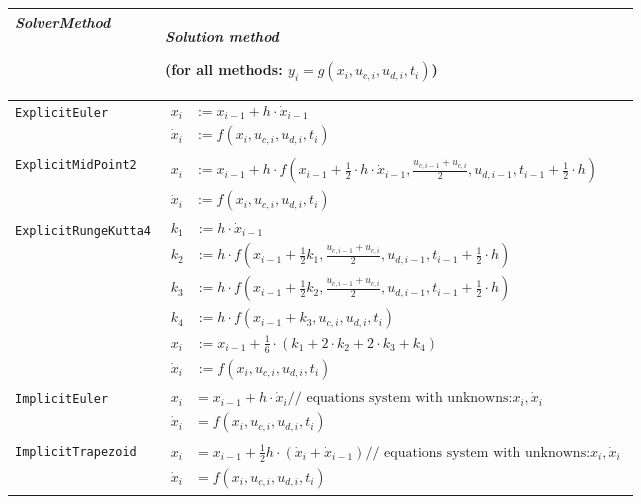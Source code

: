 \begin{longtable}[]{|p{3.5cm}|p{11cm}|}
\hline
\emph{SolverMethod} & 
\emph{Solution method}

(for all methods: $y_i=g(x_i,u_{c,i},u_{d,i},t_i)$)\\ \hline
\endhead
\lstinline!ExplicitEuler! & 
$\begin{aligned}
x_{i} &:= x_{i-1}+h\cdot\dot{x}_{i-1}\\
\dot{x}_{i} &:= f(x_i,u_{c,i},u_{d,i},t_i)
\end{aligned}$\\ \hline
\lstinline!ExplicitMidPoint2! &
$\begin{aligned}
x_{i} &:= x_{i-1}+h\cdot f(x_{i-1}+\frac{1}{2}\cdot h \cdot\dot{x}_{i-1},\frac{u_{c,i-1}+u_{c,i}}{2},u_{d,i-1},t_{i-1}+\tfrac{1}{2}\cdot h)\\
\dot{x}_{i} &:= f(x_i,u_{c,i},u_{d,i},t_i)
\end{aligned}$\\ \hline
\lstinline!ExplicitRungeKutta4! &
$\begin{aligned}
k_1 &:= h\cdot \dot{x}_{i-1}\\
k_2 &:= h\cdot f(x_{i-1}+\tfrac{1}{2}k_1,\frac{u_{c,i-1}+u_{c,i}}{2},u_{d,i-1},t_{i-1}+\tfrac{1}{2}\cdot h)\\
k_3 &:= h\cdot f(x_{i-1}+\tfrac{1}{2}k_2,\frac{u_{c,i-1}+u_{c,i}}{2},u_{d,i-1},t_{i-1}+\tfrac{1}{2}\cdot h)\\
k_4 &:= h\cdot f(x_{i-1}+k_3,u_{c,i},u_{d,i},t_i)\\
x_{i} &:= x_{i-1}+\tfrac{1}{6}\cdot(k_1+2\cdot k_2+2\cdot k_3+k_4)\\
\dot{x}_{i} &:= f(x_i,u_{c,i},u_{d,i},t_i)
\end{aligned}$
\\ \hline
\lstinline!ImplicitEuler! &$\begin{aligned}
x_{i} &= x_{i-1}+h\cdot\dot{x}_i \textrm{// equations system with unknowns:} x_i,\dot{x}_i\\
\dot{x}_{i} &= f(x_i,u_{c,i},u_{d,i},t_i)
\end{aligned}$\\ \hline
\lstinline!ImplicitTrapezoid! &$\begin{aligned}
x_{i} &= x_{i-1}+\tfrac{1}{2}h\cdot(\dot{x}_i+\dot{x}_{i-1}) \textrm{// equations system with unknowns:} x_i,\dot{x}_i\\
\dot{x}_{i} &= f(x_i,u_{c,i},u_{d,i},t_i)
\end{aligned}$\\ \hline
\end{longtable}

